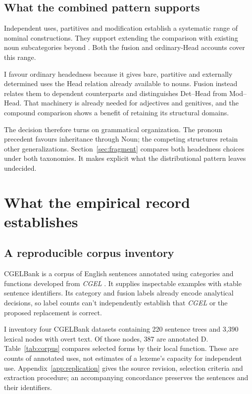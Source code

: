 \documentclass[12pt]{article}
\begin{document}
\subsection{What the combined pattern supports}\label{sec:cumulative}

Independent uses, partitives and modification establish a systematic range of nominal constructions. They support extending the comparison with existing noun subcategories beyond . Both the fusion and ordinary-Head accounts cover this range.

I favour ordinary headedness because it gives bare, partitive and externally determined uses the Head relation already available to nouns. Fusion instead relates them to dependent counterparts and distinguishes Det--Head from Mod--Head. That machinery is already needed for adjectives and genitives, and the compound comparison shows a benefit of retaining its structural domains.

The decision therefore turns on grammatical organization. The pronoun precedent favours inheritance through Noun; the competing structures retain other generalizations. Section~\ref{sec:fragment} compares both headedness choices under both taxonomies. It makes explicit what the distributional pattern leaves undecided.

\section{What the empirical record establishes}\label{sec:empirical}

\subsection{A reproducible corpus inventory}

CGELBank is a corpus of English sentences annotated using categories and functions developed from \textit{CGEL} \citep{reynolds2023unified}. It supplies inspectable examples with stable sentence identifiers. Its category and fusion labels already encode analytical decisions, so label counts can't independently establish that \textit{CGEL} or the proposed replacement is correct.

I inventory four CGELBank datasets containing 220 sentence trees and 3,390 lexical nodes with overt text. Of those nodes, 387 are annotated D. Table~\ref{tab:corpus} compares selected forms by their local function. These are counts of annotated uses, not estimates of a lexeme's capacity for independent use. Appendix~\ref{app:replication} gives the source revision, selection criteria and extraction procedure; an accompanying concordance preserves the sentences and their identifiers.
\end{document}
